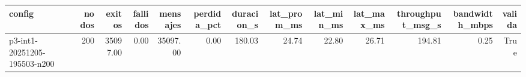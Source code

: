 \begin{tabular}{lrrrrrrrrrrrr}
\toprule
config & nodos & exitos & fallidos & mensajes & perdida_pct & duracion_s & lat_prom_ms & lat_min_ms & lat_max_ms & throughput_msg_s & bandwidth_mbps & valida \\
\midrule
p3-int1-20251205-195503-n200 & 200 & 35097.00 & 0.00 & 35097.00 & 0.00 & 180.03 & 24.74 & 22.80 & 26.71 & 194.81 & 0.25 & True \\
\bottomrule
\end{tabular}
